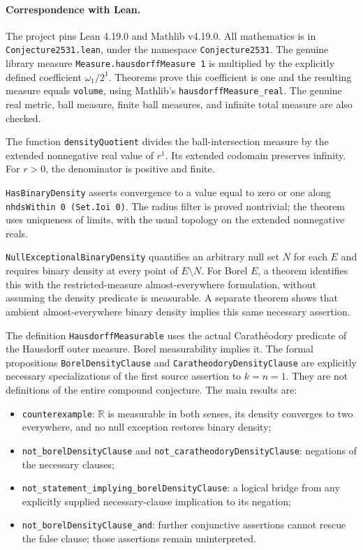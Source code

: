 \documentclass[11pt]{article}
\newcommand{\R}{\mathbb{R}}
\begin{document}
\newpage
\paragraph{Correspondence with Lean.}
The project pins Lean 4.19.0 and Mathlib v4.19.0. All mathematics is in
\texttt{Conjecture2531.lean}, under the namespace \texttt{Conjecture2531}.
The genuine library measure \texttt{Measure.hausdorffMeasure 1} is multiplied
by the explicitly defined coefficient $\omega_1/2^1$.
Theorems prove this coefficient is one and the resulting measure equals
\texttt{volume}, using Mathlib's \texttt{hausdorffMeasure\_real}. The genuine
real metric, ball measure, finite ball measures, and infinite total measure
are also checked.

The function \texttt{densityQuotient} divides the ball-intersection measure
by the extended nonnegative real value of $r^1$. Its extended codomain
preserves infinity. For $r>0$, the denominator is positive and finite.

\texttt{HasBinaryDensity} asserts convergence to a value equal to zero or one
along \texttt{nhdsWithin 0 (Set.Ioi 0)}. The radius filter is proved
nontrivial; the theorem uses uniqueness of limits, with the usual topology
on the extended nonnegative reals.

\texttt{NullExceptionalBinaryDensity} quantifies an arbitrary null set $N$
for each $E$ and requires binary density at every point of $E\setminus N$.
For Borel $E$, a theorem identifies this with the restricted-measure
almost-everywhere formulation, without assuming the density predicate is
measurable. A separate theorem shows that ambient almost-everywhere binary
density implies this same necessary assertion.

The definition \texttt{HausdorffMeasurable} uses the actual Carath\'eodory
predicate of the Hausdorff outer measure. Borel measurability implies it.
The formal propositions \texttt{BorelDensityClause} and
\texttt{CaratheodoryDensityClause} are explicitly necessary specializations
of the first source assertion to $k=n=1$. They are not definitions of the
entire compound conjecture. The main results are:
\begin{itemize}
\item \texttt{counterexample}: $\R$ is measurable in both senses, its density
converges to two everywhere, and no null exception restores binary density;
\item \texttt{not\_borelDensityClause} and
\texttt{not\_caratheodoryDensityClause}: negations of the necessary clauses;
\item \texttt{not\_statement\_implying\_borelDensityClause}: a logical bridge
from any explicitly supplied necessary-clause implication to its negation;
\item \texttt{not\_borelDensityClause\_and}: further conjunctive assertions
cannot rescue the false clause; those assertions remain uninterpreted.
\end{itemize}
\end{document}

